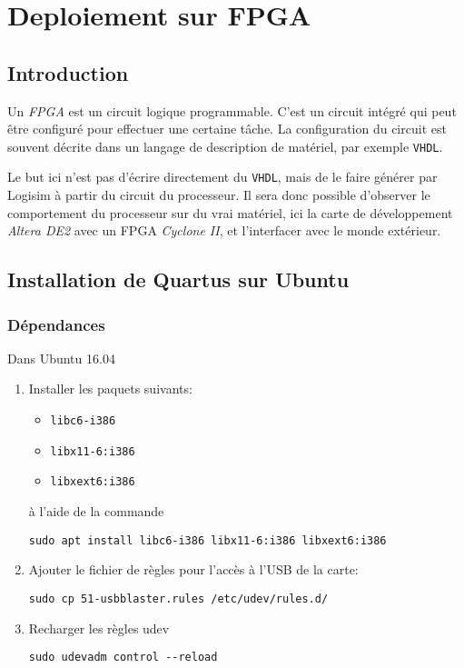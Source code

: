 \section{Deploiement sur FPGA}

\subsection{Introduction}

Un \textit{FPGA} est un circuit logique programmable. C'est un circuit intégré qui peut être configuré pour effectuer une certaine tâche. La configuration du circuit est souvent décrite dans un langage de description de matériel, par exemple \texttt{VHDL}.

Le but ici n'est pas d'écrire directement du \texttt{VHDL}, mais de le faire générer par Logisim à partir du circuit du processeur.
Il sera donc possible d'observer le comportement du processeur sur du vrai matériel, ici la carte de développement \textit{Altera DE2} avec un FPGA \textit{Cyclone II}, et l'interfacer avec le monde extérieur.

\subsection{Installation de Quartus sur Ubuntu}
\subsubsection{Dépendances}
\noindent Dans Ubuntu 16.04
\vspace{0.2em}
\begin{enumerate}
	\item Installer les paquets suivants:
	\begin{itemize}
		\item \texttt{libc6-i386}
		\item \texttt{libx11-6:i386}
		\item \texttt{libxext6:i386}
	\end{itemize}
	à l'aide de la commande
	\begin{lstlisting}
sudo apt install libc6-i386 libx11-6:i386 libxext6:i386
	\end{lstlisting}

	\item Ajouter le fichier de règles pour l'accès à l'USB de la carte:
	\begin{lstlisting}
sudo cp 51-usbblaster.rules /etc/udev/rules.d/
	\end{lstlisting}
	\item Recharger les règles udev
	\begin{lstlisting}
sudo udevadm control --reload
	\end{lstlisting}
\end{enumerate}

